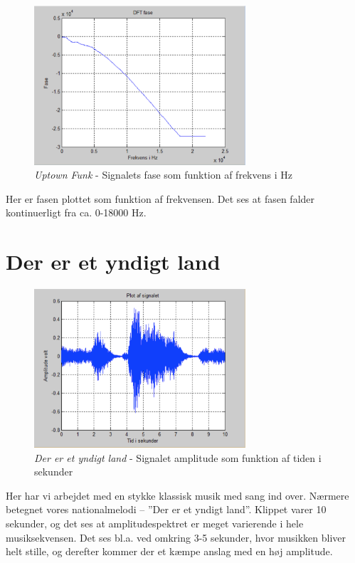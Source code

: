 \begin{figure}[H]
	\centering
	\includegraphics[width=0.7\textwidth]{Figurer/UptownFunk4}
	\caption{\textit{Uptown Funk} - Signalets fase som funktion af frekvens i Hz}
\end{figure}

Her er fasen plottet som funktion af frekvensen. Det ses at fasen falder kontinuerligt fra ca. 0-18000 Hz.

\section{Der er et yndigt land}

\begin{figure}[H]
	\centering
	\includegraphics[width=0.7\textwidth]{Figurer/Nationalsang}
	\caption{\textit{Der er et yndigt land} - Signalet amplitude som funktion af tiden i sekunder}
\end{figure}

Her har vi arbejdet med en stykke klassisk musik med sang ind over. Nærmere betegnet vores nationalmelodi – ”Der er et yndigt land”. Klippet varer 10 sekunder, og det ses at amplitudespektret er meget varierende i hele musiksekvensen. Det ses bl.a. ved omkring 3-5 sekunder, hvor musikken bliver helt stille, og derefter kommer der et kæmpe anslag med en høj amplitude.

